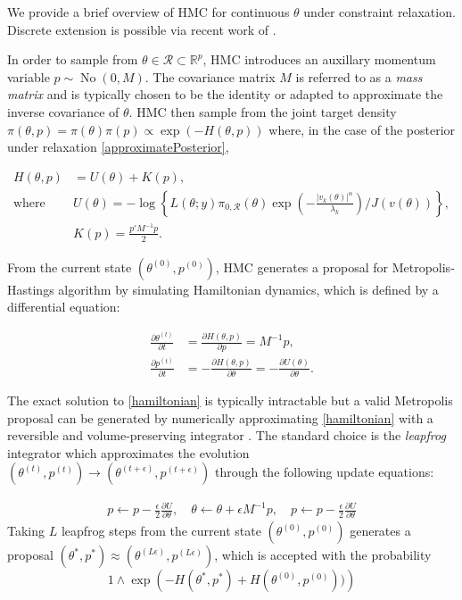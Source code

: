 \documentclass[10pt]{article}
\newcommand{\mc}[1]{\mathcal{#1}}
\DeclareMathOperator{\No}{No}
\DeclareMathOperator{\1}{\mathbbm{1}}
\newcommand{\dt}{\epsilon} %
\newcommand{\mass}{M} %
\begin{document}
We provide a brief overview of HMC for continuous $\theta$ under constraint relaxation. Discrete extension is possible via recent work of \cite{nishimura2017discontinuous}.

In order to sample from $\theta\in\mc R \subset \mathbb R^p$, HMC introduces an auxillary momentum variable $p \sim \No(0, \mass)$. The covariance matrix $\mass$ is referred to as a \textit{mass matrix} and is typically chosen to be the identity or adapted to approximate the inverse covariance of $\theta$. HMC then sample from the joint target density $\pi(\theta, p) = \pi(\theta) \pi(p) \propto \exp (- H(\theta, p))$ where, in the case of the posterior under relaxation \eqref{approximatePosterior}, 


\begin{equation}
\begin{aligned}
H(\theta, p)& = U(\theta)+K(p),\\
\text{where } & U(\theta) = -\log\left\{ L(\theta;y)\pi_{0,\mc R}(\theta) \exp( - \frac{|v_k(\theta)|^\alpha}{\lambda_k}) / J(v(\theta)) \right\},\\
& K(p) = \frac{p'\mass^{-1} p}{2}.
\end{aligned}
\end{equation}

From the current state $(\theta^{(0)},p^{(0)})$, HMC generates a proposal for Metropolis-Hastings algorithm by simulating Hamiltonian dynamics, which is defined by a differential equation:

\begin{equation}
\begin{aligned}
\label{hamiltonian}
\frac{\partial \theta ^{(t)}}{\partial t} & =\frac{\partial H(\theta, p)}{\partial p} = \mass^{-1}p,\\
\frac{\partial p^{(t)}}{\partial t}& =-\frac{\partial H(\theta, p)}{\partial \theta} = -\frac{\partial U(\theta)}{\partial \theta}.
\end{aligned}
\end{equation}

The exact solution to \eqref{hamiltonian} is typically intractable but a valid Metropolis proposal can be generated by numerically approximating \eqref{hamiltonian} with a reversible and volume-preserving  integrator \citep{neal2011mcmc}. The standard choice is the \textit{leapfrog} integrator which approximates the evolution $(\theta^{(t)},p^{(t)}) \to (\theta^{(t + \dt)},p^{(t + \dt)})$ through the following update equations:

\begin{equation}
\begin{aligned}
\label{leap-frog}
p \leftarrow p - \frac{\dt}{2} \frac{\partial U}{\partial  \theta },\quad
\theta \leftarrow  \theta  + \dt \mass^{-1}p,\quad
p \leftarrow p -  \frac{\dt}{2}  \frac{\partial U}{\partial  \theta } 
\end{aligned}
\end{equation}
Taking $L$ leapfrog steps from the current state $(\theta^{(0)},p^{(0)})$ generates a proposal $(\theta^{*},p^{*}) \approx (\theta^{(L \dt)},p^{(L \dt)})$, which is accepted with the probability 
$$1\wedge \exp  \left( - H(\theta^{*},p^{*}) + H(\theta^{(0)},p^{(0)}))\right)$$
\end{document}
